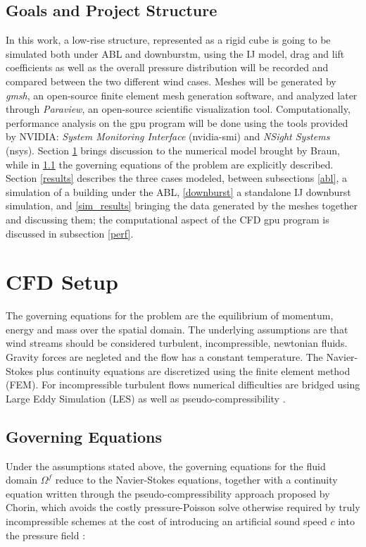 \documentclass{article}
\begin{document}
\subsection{Goals and Project Structure}
  In this work, a low-rise structure, represented as a rigid cube is going to be simulated both under ABL and downburstm, using the IJ model, drag and lift coefficients as well as the overall pressure distribution will be recorded and compared between the two different wind cases. Meshes will be generated by \textit{gmsh}, an open-source finite element mesh generation software, and analyzed later through \textit{Paraview}, an open-source scientific visualization tool. Computationally, performance analysis on the gpu program will be done using the tools provided by NVIDIA: \textit{System Monitoring Interface} (nvidia-smi) and \textit{NSight Systems} (nsys). Section \ref{cfdsetup} brings discussion to the numerical model brought by Braun\cite{braun}, while in \ref{model} the governing equations of the problem are explicitly described. Section \ref{results} describes the three cases modeled, between subsections \ref{abl}, a simulation of a building under the ABL, \ref{downburst} a standalone IJ downburst simulation, and \ref{sim_results} bringing the data generated by the meshes together and discussing them; the computational aspect of the CFD gpu program is discussed in subsection \ref{perf}.

\section{CFD Setup} \label{cfdsetup}
The governing equations for the problem are the equilibrium of momentum, energy and mass over the spatial domain. The underlying assumptions are that wind streams should be considered turbulent, incompressible, newtonian fluids. Gravity forces are negleted and the flow has a constant temperature. The Navier-Stokes plus continuity equations are discretized using the finite element method (FEM). For incompressible turbulent flows numerical difficulties are bridged using Large Eddy Simulation (LES) as well as pseudo-compressibility \cite{braun09}.

\subsection{Governing Equations} \label{model}

Under the assumptions stated above, the governing equations for the fluid domain $\Omega^f$ reduce to the Navier-Stokes equations, together with a continuity equation written through the pseudo-compressibility approach proposed by Chorin, which avoids the costly pressure-Poisson solve otherwise required by truly incompressible schemes at the cost of introducing an artificial sound speed $c$ into the pressure field \cite{braun09}:
\end{document}
